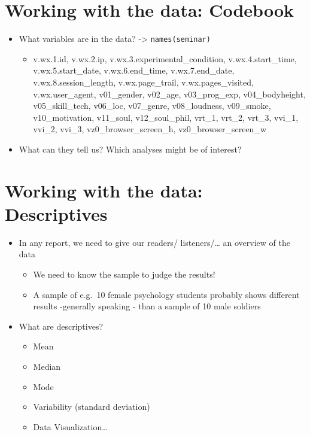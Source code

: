 \documentclass[
]{book}
\providecommand{\tightlist}{%
  \setlength{\itemsep}{0pt}\setlength{\parskip}{0pt}}
\begin{document}
\section{\texorpdfstring{Working with the data: Codebook}{Working with the data:   Codebook}}\label{working-with-the-data-codebook}

\begin{itemize}
\tightlist
\item
  What variables are in the data? -\textgreater{} \texttt{names(seminar)}

  \begin{itemize}
  \tightlist
  \item
    v.wx.1.id, v.wx.2.ip, v.wx.3.experimental\_condition, v.wx.4.start\_time, v.wx.5.start\_date, v.wx.6.end\_time, v.wx.7.end\_date, v.wx.8.session\_length, v.wx.page\_trail, v.wx.pages\_visited, v.wx.user\_agent, v01\_gender, v02\_age, v03\_prog\_exp, v04\_bodyheight, v05\_skill\_tech, v06\_loc, v07\_genre, v08\_loudness, v09\_smoke, v10\_motivation, v11\_soul, v12\_soul\_phil, vrt\_1, vrt\_2, vrt\_3, vvi\_1, vvi\_2, vvi\_3, vz0\_browser\_screen\_h, vz0\_browser\_screen\_w
  \end{itemize}
\item
  What can they tell us? Which analyses might be of interest?
\end{itemize}

\section{\texorpdfstring{Working with the data: Descriptives}{Working with the data:   Descriptives}}\label{working-with-the-data-descriptives}

\begin{itemize}
\tightlist
\item
  In any report, we need to give our readers/ listeners/\ldots{} an overview of the data

  \begin{itemize}
  \tightlist
  \item
    We need to know the sample to judge the results!
  \item
    A sample of e.g.~10 female psychology students probably shows different results -generally speaking - than a sample of 10 male soldiers
  \end{itemize}
\item
  What are descriptives?

  \begin{itemize}
  \tightlist
  \item
    Mean
  \item
    Median
  \item
    Mode
  \item
    Variability (standard deviation)
  \item
    Data Visualization\ldots{}
  \end{itemize}
\end{itemize}
\end{document}
